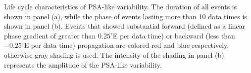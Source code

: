 \label{fig:lifecycle}
Life cycle characteristics of PSA-like variability. The duration of all events is shown in panel (a), while the phase of events lasting more than 10 data times is shown in panel (b). Events that showed substantial forward (defined as a linear phase gradient of greater than $0.25^{\circ}$E per data time) or backward (less than $-0.25^{\circ}$E per data time) propagation are colored red and blue respectively, otherwise gray shading is used. The intensity of the shading in panel (b) represents the amplitude of the PSA-like variability.
